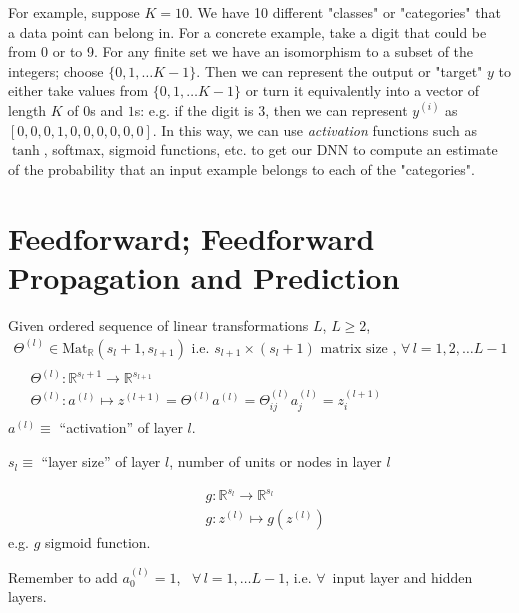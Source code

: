 \documentclass[10pt]{amsart}
\begin{document}
\begin{multicols*}{2}
For example, suppose $K=10$.  We have 10 different "classes" or "categories" that a data point can belong in.  For a concrete example, take a digit that could be from 0 or to 9.  For any finite set we have an isomorphism to a subset of the integers; choose $\lbrace 0 ,1,\dots K-1\rbrace$.  Then we can represent the output or "target" $y$ to either take values from $\lbrace 0 ,1,\dots K-1\rbrace$ or turn it equivalently into a vector of length $K$ of $0$s and $1$s: e.g. if the digit is 3, then we can represent $y^{(i)}$ as $[0,0,0,1,0,0,0,0,0,0]$.  In this way, we can use \emph{activation} functions such as $\tanh$, softmax, sigmoid functions, etc. to get our DNN to compute an estimate of the probability that an input example belongs to each of the "categories".    

\section{Feedforward; Feedforward Propagation and Prediction}

Given ordered sequence of linear transformations $L$, $L\geq 2$,
\begin{equation}
\begin{gathered}
  \Theta^{(l)} \in \text{Mat}_{\mathbb{R}}( s_l + 1, s_{l+1} ) \text{ i.e. } s_{l+1} \times (s_l +1) \text{ matrix size }, \, \forall \, l = 1,2, \dots L - 1  \\
  \begin{aligned}
    & \Theta^{(l)} : \mathbb{R}^{s_l +1} \to \mathbb{R}^{s_{l+1} } \\ 
    & \Theta^{(l)} : a^{(l)} \mapsto z^{(l+1) } = \Theta^{(l)} a^{(l)} = \Theta_{ij}^{(l)} a_j^{(l)} = z_i^{(l+1)}
    \end{aligned}
\end{gathered}
\end{equation}
$a^{(l)} \equiv $ ``activation'' of layer $l$.  

$s_l \equiv $ ``layer size'' of layer $l$, number of units or nodes in layer $l$

\begin{equation}
\begin{aligned}
  & g: \mathbb{R}^{s_l } \to \mathbb{R}^{s_l} \\ 
  & g : z^{(l)} \mapsto g(z^{(l)} )
  \end{aligned}
  \end{equation}
e.g. $g$ sigmoid function.

Remember to add $a_0^{(l)} = 1$, \, $\forall \, l = 1, \dots L-1$, i.e. $\forall \, $ input layer and hidden layers.


\end{multicols*}
\end{document}
